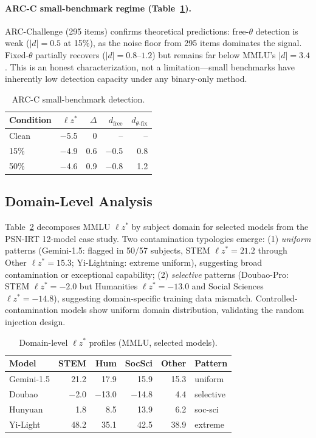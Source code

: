 \documentclass[11pt,twocolumn]{article}
\newcommand{\lzs}{\ensuremath{\ell z^*}}
\begin{document}
\paragraph{ARC-C small-benchmark regime (Table~\ref{tab:arcc}).} ARC-Challenge (295 items) confirms theoretical predictions: free-$\theta$ detection is weak ($|d| = 0.5$ at 15\%), as the noise floor from 295 items dominates the signal. Fixed-$\theta$ partially recovers ($|d| = 0.8$--$1.2$) but remains far below MMLU's $|d| = 3.4$. This is an honest characterization, not a limitation---small benchmarks have inherently low detection capacity under any binary-only method.

\begin{table}[t]
\centering
\caption{ARC-C small-benchmark detection.}
\label{tab:arcc}
\footnotesize
\begin{tabular}{lrrrr}
\toprule
Condition & $\lzs$ & $\Delta$ & $d_{\text{free}}$ & $d_{\theta\text{-fix}}$ \\
\midrule
Clean & $-$5.5 & 0 & -- & -- \\
15\% & $-$4.9 & 0.6 & $-$0.5 & 0.8 \\
50\% & $-$4.6 & 0.9 & $-$0.8 & 1.2 \\
\bottomrule
\end{tabular}
\vspace{-0.3cm}
\end{table}

\subsection{Domain-Level Analysis}
\label{sec:domain}

Table~\ref{tab:domain} decomposes MMLU $\lzs$ by subject domain for selected models from the PSN-IRT 12-model case study. Two contamination typologies emerge: (1) \emph{uniform} patterns (Gemini-1.5: flagged in 50/57 subjects, STEM $\lzs = 21.2$ through Other $\lzs = 15.3$; Yi-Lightning: extreme uniform), suggesting broad contamination or exceptional capability; (2) \emph{selective} patterns (Doubao-Pro: STEM $\lzs = -2.0$ but Humanities $\lzs = -13.0$ and Social Sciences $\lzs = -14.8$), suggesting domain-specific training data mismatch. Controlled-contamination models show uniform domain distribution, validating the random injection design.

\begin{table}[t]
\centering
\caption{Domain-level $\lzs$ profiles (MMLU, selected models).}
\label{tab:domain}
\footnotesize
\begin{tabular}{lrrrrl}
\toprule
Model & STEM & Hum & SocSci & Other & Pattern \\
\midrule
Gemini-1.5 & 21.2 & 17.9 & 15.9 & 15.3 & uniform \\
Doubao & $-$2.0 & $-$13.0 & $-$14.8 & 4.4 & selective \\
Hunyuan & 1.8 & 8.5 & 13.9 & 6.2 & soc-sci \\
Yi-Light & 48.2 & 35.1 & 42.5 & 38.9 & extreme \\
\bottomrule
\end{tabular}
\vspace{-0.3cm}
\end{table}
\end{document}
